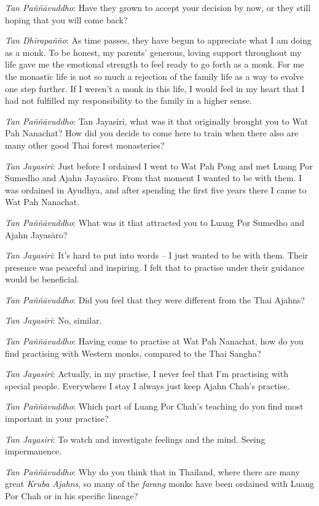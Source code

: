 \emph{Tan Paññāvuddho}: Have they grown to accept your decision by now, 
or they still hoping that you will come back? 

\emph{Tan Dhīrapañño}: As time passes, they have begun to appreciate
what I am doing as a monk. To be honest, my parents' generous, loving
support throughout my life gave me the emotional strength to feel ready
to go forth as a monk. For me the monastic life is not so much a
rejection of the family life as a way to evolve one step further. If I
weren't a monk in this life, I would feel in my heart that I had not
fulfilled my responsibility to the family in a higher sense. 

\emph{Tan Paññāvuddho}: Tan Jayasiri, what was it that originally
brought you to Wat Pah Nanachat? How did you decide to come here to
train when there also are many other good Thai forest monasteries? 

\emph{Tan Jayasiri}: Just before I ordained I went to Wat Pah Pong and
met Luang Por Sumedho and Ajahn Jayasāro. From that moment I wanted to
be with them. I was ordained in Ayudhya, and after spending the first
five years there I came to Wat Pah Nanachat. 

\emph{Tan Paññāvuddho}: What was it that attracted you to Luang Por
Sumedho and Ajahn Jayasāro? 

\emph{Tan Jayasiri}: It's hard to put into words -- I just wanted to be
with them. Their presence was peaceful and inspiring. I felt that to
practise under their guidance would be beneficial. 

\emph{Tan Paññāvuddho}: Did you feel that they were different from the
Thai Ajahns? 

\emph{Tan Jayasiri}: No, similar. 

\emph{Tan Paññāvuddho}: Having come to practise at Wat Pah Nanachat, 
how do you find practising with Western monks, compared to the Thai
Sangha? 

\emph{Tan Jayasiri}: Actually, in my practise, I never feel that I'm
practising with special people. Everywhere I stay I always just keep
Ajahn Chah's practise. 

\emph{Tan Paññāvuddho}: Which part of Luang Por Chah's teaching do you
find most important in your practise? 

\emph{Tan Jayasiri}: To watch and investigate feelings and the mind. 
Seeing impermanence. 

\emph{Tan Paññāvuddho}: Why do you think that in Thailand, where there
are many great \emph{Kruba Ajahns}, so many of the \emph{farang} monks
have been ordained with Luang Por Chah or in his specific lineage? 

